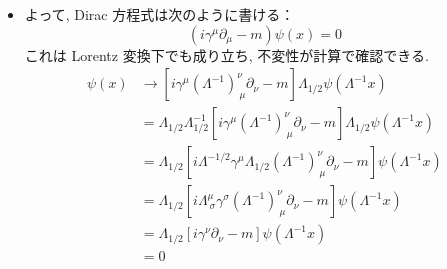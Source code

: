 \documentclass[a4paper,12pt]{article}
\begin{document}
\begin{itemize}
    \item よって, Dirac 方程式は次のように書ける：
    \begin{equation*}
    (i \gamma^\mu \partial_\mu - m)\psi(x) = 0 \label{3.31}\tag{3.31}
    \end{equation*}
    これは Lorentz 変換下でも成り立ち, 不変性が計算で確認できる.
    \begin{align*}
        [i \gamma^\mu \partial_\mu - m] \psi(x)
        &\rightarrow [i \gamma^\mu (\Lambda^{-1})^\nu_{\ \mu} \partial_\nu - m] \Lambda_{1/2} \psi(\Lambda^{-1} x) \\
        &= \Lambda_{1/2} \Lambda^{-1}_{1/2} [i \gamma^\mu (\Lambda^{-1})^\nu_{\ \mu} \partial_\nu - m] \Lambda_{1/2} \psi(\Lambda^{-1} x) \\
        &= \Lambda_{1/2} \left[i \Lambda^{-1/2} \gamma^\mu \Lambda_{1/2} (\Lambda^{-1})^\nu_{\ \mu} \partial_\nu - m\right] \psi(\Lambda^{-1} x) \\
        &= \Lambda_{1/2} \left[i \Lambda^\mu_{\ \sigma} \gamma^\sigma (\Lambda^{-1})^\nu_{\ \mu} \partial_\nu - m\right] \psi(\Lambda^{-1} x) \\
        &= \Lambda_{1/2} [i \gamma^\nu \partial_\nu - m] \psi(\Lambda^{-1} x) \\
        &= 0
        \end{align*}
    

\end{itemize}
\end{document}
